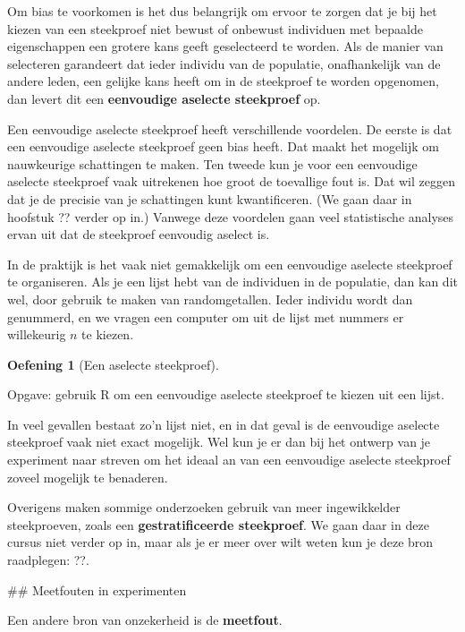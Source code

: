 \documentclass[
  a4paper,
]{scrbook}
\theoremstyle{definition}
\newtheorem{exercise}{Oefening}[chapter]
\theoremstyle{definition}
\theoremstyle{remark}
\begin{document}
Om bias te voorkomen is het dus belangrijk om ervoor te zorgen dat je
bij het kiezen van een steekproef niet bewust of onbewust individuen met
bepaalde eigenschappen een grotere kans geeft geselecteerd te worden.
Als de manier van selecteren garandeert dat ieder individu van de
populatie, onafhankelijk van de andere leden, een gelijke kans heeft om
in de steekproef te worden opgenomen, dan levert dit een
\textbf{eenvoudige aselecte steekproef} op.

Een eenvoudige aselecte steekproef heeft verschillende voordelen. De
eerste is dat een eenvoudige aselecte steekproef geen bias heeft. Dat
maakt het mogelijk om nauwkeurige schattingen te maken. Ten tweede kun
je voor een eenvoudige aselecte steekproef vaak uitrekenen hoe groot de
toevallige fout is. Dat wil zeggen dat je de precisie van je schattingen
kunt kwantificeren. (We gaan daar in hoofstuk ?? verder op in.) Vanwege
deze voordelen gaan veel statistische analyses ervan uit dat de
steekproef eenvoudig aselect is.

In de praktijk is het vaak niet gemakkelijk om een eenvoudige aselecte
steekproef te organiseren. Als je een lijst hebt van de individuen in de
populatie, dan kan dit wel, door gebruik te maken van randomgetallen.
Ieder individu wordt dan genummerd, en we vragen een computer om uit de
lijst met nummers er willekeurig \(n\) te kiezen.

\begin{exercise}[Een aselecte
steekproef]\protect\hypertarget{exr-aselect}{}\label{exr-aselect}

Opgave: gebruik R om een eenvoudige aselecte steekproef te kiezen uit
een lijst.

\end{exercise}

In veel gevallen bestaat zo'n lijst niet, en in dat geval is de
eenvoudige aselecte steekproef vaak niet exact mogelijk. Wel kun je er
dan bij het ontwerp van je experiment naar streven om het ideaal an van
een eenvoudige aselecte steekproef zoveel mogelijk te benaderen.

Overigens maken sommige onderzoeken gebruik van meer ingewikkelder
steekproeven, zoals een \textbf{gestratificeerde steekproef}. We gaan
daar in deze cursus niet verder op in, maar als je er meer over wilt
weten kun je deze bron raadplegen: ??.

\#\# Meetfouten in experimenten

Een andere bron van onzekerheid is de \textbf{meetfout}.
\end{document}
